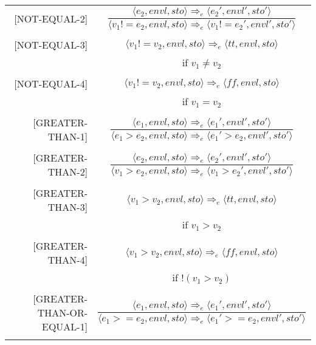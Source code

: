 \begin{longtable}[c] { r c }
  [NOT-EQUAL-2] & \( 
    \dfrac { \langle e_2, envl, sto \rangle \Rightarrow_e \langle e_2', envl', sto' \rangle }
      { \langle v_1 != e_2, envl, sto \rangle \Rightarrow_e \langle v_1 != e_2', envl', sto' \rangle } \)
  \\
  & \\

  [NOT-EQUAL-3] & \( 
    \langle v_1 != v_2, envl, sto \rangle \Rightarrow_e \langle tt, envl, sto \rangle \)
  \\
  & if \( v_1 \neq v_2 \) \\
  & \\

  [NOT-EQUAL-4] & \( 
    \langle v_1 != v_2, envl, sto \rangle \Rightarrow_e \langle ff, envl, sto \rangle \)
  \\
  & if \( v_1 = v_2 \) \\
  & \\

  [GREATER-THAN-1] & \( 
    \dfrac { \langle e_1, envl, sto \rangle \Rightarrow_e \langle e_1', envl', sto' \rangle }
      { \langle e_1 > e_2, envl, sto \rangle \Rightarrow_e \langle e_1' > e_2, envl', sto' \rangle } \)
  \\
  & \\

  [GREATER-THAN-2] & \( 
    \dfrac { \langle e_2, envl, sto \rangle \Rightarrow_e \langle e_2', envl', sto' \rangle }
      { \langle v_1 > e_2, envl, sto \rangle \Rightarrow_e \langle v_1 > e_2', envl', sto' \rangle } \)
  \\
  & \\

  [GREATER-THAN-3] & \( 
    \langle v_1 > v_2, envl, sto \rangle \Rightarrow_e \langle tt, envl, sto \rangle \)
  \\
  & if \( v_1 > v_2 \) \\
  & \\

  [GREATER-THAN-4] & \( 
    \langle v_1 > v_2, envl, sto \rangle \Rightarrow_e \langle ff, envl, sto \rangle \)
  \\
  & if \( !(v_1 > v_2) \) \\
  & \\

  [GREATER-THAN-OR-EQUAL-1] & \( 
    \dfrac { \langle e_1, envl, sto \rangle \Rightarrow_e \langle e_1', envl', sto' \rangle }
      { \langle e_1 > = e_2, envl, sto \rangle \Rightarrow_e \langle e_1' > = e_2, envl', sto' \rangle } \)
  \\
  & \\


\end{longtable}
